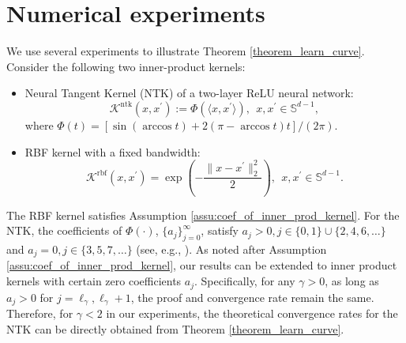 \documentclass{article}
\theoremstyle{plain}
\theoremstyle{definition}
\theoremstyle{remark}
\begin{document}
\section{Numerical experiments}\label{sec_experiments}
We use several experiments to illustrate Theorem \ref{theorem_learn_curve}.
Consider the following two inner-product kernels:
\begin{itemize}
    \item[(i)] Neural Tangent Kernel (NTK) of a two-layer ReLU neural network:
    $$
        \mathscr{K}^{\mathrm{ntk}}(x, x^\prime) := \Phi(\langle x, x^{\prime} \rangle), ~~x, x^{\prime} \in \mathbb{S}^{d-1},
    $$
    where $\Phi(t)=\left[\sin{(\arccos t)}+2(\pi-\arccos t)t\right]/ (2 \pi)$.
    
    \item[(ii)] RBF kernel with a fixed bandwidth:
    $$
        \mathscr{K}^{\mathrm{rbf}}(x,x^{\prime}) = \exp{\left(-\frac{\|x-x^{\prime}\|_{2}^{2}}{2}\right)}, ~~x, x^{\prime} \in \mathbb{S}^{d-1}.
    $$
\end{itemize}
The RBF kernel satisfies Assumption \ref{assu:coef_of_inner_prod_kernel}. For the NTK, the coefficients of $\Phi(\cdot)$, $\{a_{j}\}_{j=0}^{\infty}$, satisfy $ a_{j} > 0, j \in \{0, 1\} \cup \{2,4,6,\ldots\}$ and $ a_{j} = 0, j \in \{3,5,7,\ldots\}$ (see, e.g., \cite{lu2023optimal}). 
As noted after Assumption \ref{assu:coef_of_inner_prod_kernel}, our results can be extended to inner product kernels with certain zero coefficients $a_j$. Specifically, for any $\gamma>0$, as long as $ a_{j} > 0$ for $j = \ell_{\gamma}, \ell_{\gamma}+1$, the proof and convergence rate remain the same. Therefore, for $\gamma<2$ in our experiments, the theoretical convergence rates for the NTK can be directly obtained from Theorem \ref{theorem_learn_curve}. 
\end{document}
